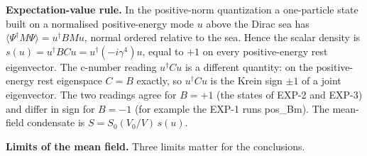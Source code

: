 \documentclass[11pt]{article}
\begin{document}
\textbf{Expectation-value rule.} In the positive-norm quantization a one-particle state built on a normalised positive-energy mode $u$ above the Dirac sea has $\langle\Psi^\dagger M\Psi\rangle=u^\dagger BMu$, normal ordered relative to the sea. Hence the scalar density is $s(u)=u^\dagger BCu=u^\dagger(-i\gamma^4)u$, equal to $+1$ on every positive-energy rest eigenvector. The c-number reading $u^\dagger Cu$ is a different quantity: on the positive-energy rest eigenspace $C=B$ exactly, so $u^\dagger Cu$ is the Krein sign $\pm1$ of a joint eigenvector. The two readings agree for $B=+1$ (the states of EXP-2 and EXP-3) and differ in sign for $B=-1$ (for example the EXP-1 runs pos\_Bm). The mean-field condensate is $S=S_0(V_0/V)\,s(u)$.

\textbf{Limits of the mean field.} Three limits matter for the conclusions.
\end{document}

